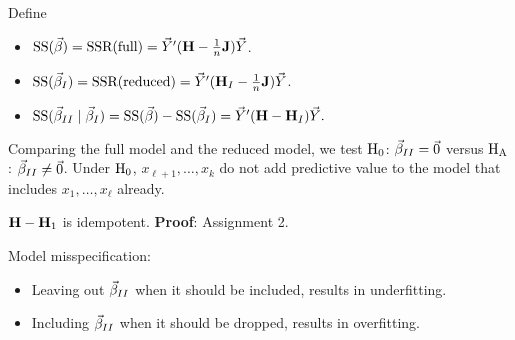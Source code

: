 Define
\begin{itemize}
    \item $ \text{SS}(\vec{\beta})=\text{SSR}(\text{full})=\vec{Y}'(\mathbf{H}-\tfrac{1}{n}\mathbf{J})\vec{Y} $.
    \item $ \text{SS}(\vec{\beta}_I)=\text{SSR}(\text{reduced})=\vec{Y}'(\mathbf{H}_I-\tfrac{1}{n}\mathbf{J})\vec{Y} $.
    \item $ \text{SS}(\vec{\beta}_{II}\mid \vec{\beta}_{I})
              =\text{SS}(\vec{\beta})-\text{SS}(\vec{\beta}_I)
              =\vec{Y}'(\mathbf{H}-\mathbf{H}_I)\vec{Y}. $
\end{itemize}
Comparing the full model and the reduced model, we test
$ \text{H}_0 $: $ \vec{\beta}_{II}=\vec{0} $ versus $ \text{H}_{\text{A}} $: $ \vec{\beta}_{II}\ne \vec{0} $.
Under $ \text{H}_0 $, $ x_{\ell+1},\ldots,x_k $ do not add predictive value to
the model that includes $ x_1,\ldots,x_{\ell} $ already.
\begin{Theorem}{}{}
    $ \mathbf{H}-\mathbf{H}_1 $ is idempotent.
    \tcblower{}
    \textbf{Proof}: Assignment 2.
\end{Theorem}
Model misspecification:
\begin{itemize}
    \item Leaving out $ \vec{\beta}_{II} $ when it should be included,
          results in underfitting.
    \item Including $ \vec{\beta}_{II} $ when it should be dropped,
          results in overfitting.
\end{itemize}